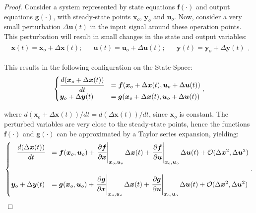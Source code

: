 \documentclass[a4paper,11pt]{book}
\numberwithin{figure}{chapter}
\numberwithin{equation}{chapter}
\numberwithin{table}{chapter}
\theoremstyle{definition}
\begin{document}
\begin{proof}
    Consider a system represented by state equations $\bm{f}(\cdot)$ and output equations $\bm{g}(\cdot)$, with steady-state points $\bm{x}_o$, $\bm{y}_o$ and $\bm{u}_o$. Now, consider a very small perturbation $\Delta \bm{u}(t)$ in the input signal around these operation points. This perturbation will result in small changes in the state and output variables:
    \begin{align}
    \begin{matrix}
        \bm{x}(t) = \bm{x}_o + \Delta \bm{x}(t); & &
        \bm{u}(t) = \bm{u}_o + \Delta \bm{u}(t); & &
        \bm{y}(t) = \bm{y}_o + \Delta \bm{y}(t)
    \end{matrix}
    .\end{align}
    
    \noindent This results in the following configuration on the State-Space:
    \begin{align}
    \begin{cases}
        \cfrac{d(\bm{x}_o + \Delta \bm{x}(t))}{dt} &= \bm{f}(\bm{x}_o + \Delta \bm{x}(t), \bm{u}_o + \Delta \bm{u}(t) ) \\
        \bm{y}_o + \Delta \bm{y}(t) &= \bm{g}(\bm{x}_o + \Delta \bm{x}(t), \bm{u}_o + \Delta \bm{u}(t) ) \\
    \end{cases}
    ,\end{align}
    
    \noindent where $d(\bm{x}_o + \Delta \bm{x}(t)) / dt = d(\Delta \bm{x}(t)) / dt$, since $\bm{x}_o$ is constant. The perturbed variables are very close to the steady-state points, hence the functions $\bm{f}(\cdot)$ and $\bm{g}(\cdot)$ can be approximated by a Taylor series expansion, yielding:
    \begin{align}
    \begin{cases}
        \hfill \cfrac{d(\Delta \bm{x}(t))}{dt} &= \bm{f}(\bm{x}_o, \bm{u}_o) + \left. \cfrac{\partial \bm{f}}{\partial \bm{x}}\right\vert_{\bm{x}_o, \bm{u}_o} \Delta \bm{x}(t) + \left. \cfrac{\partial \bm{f}}{\partial \bm{u}}\right\vert_{\bm{x}_o, \bm{u}_o}  \Delta \bm{u}(t) + \mathcal{O}(\Delta \bm{x}^2, \Delta \bm{u}^2) \\ \\
        \bm{y}_o + \Delta \bm{y}(t) &= \bm{g}(\bm{x}_o, \bm{u}_o) + \left. \cfrac{\partial \bm{g}}{\partial \bm{x}}\right\vert_{\bm{x}_o, \bm{u}_o} \Delta \bm{x}(t) + \left. \cfrac{\partial \bm{g}}{\partial \bm{u}}\right\vert_{\bm{x}_o, \bm{u}_o}  \Delta \bm{u}(t) + \mathcal{O}(\Delta \bm{x}^2, \Delta \bm{u}^2) \\
    \end{cases}
    .\end{align}
    

\end{proof}
\end{document}
